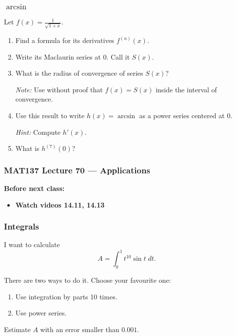 \documentclass[14pt]{beamer}
\newcommand{\p}{\pause}
\newcommand{\setsize}[1]{\fontsize{#1}{#1}\selectfont} %
\newcommand{\vv}{\vspace{.5cm}}
\newcommand{\vvv}{\vspace{.2cm}}
\begin{document}
	\begin{frame}[t]
		\frametitle{$\arcsin$}

		Let ${\displaystyle f(x)=\frac{1}{\sqrt{1+x}}}$.
		\begin{enumerate}
			\item Find a formula for its derivatives ${\displaystyle f^{(n)}(x)}$.
				\vvv

			\item Write its Maclaurin series at $0$. Call it $S(x)$. \vvv

			\item What is the radius of convergence of series $S(x)$?

				{\setsize{12} \emph{Note:} Use without proof that ${\displaystyle f(x)=S(x)}$ inside the interval of convergence. }
				\vvv

			\item Use this result to write $h(x) = \arcsin$ as a power series centered
				at $0$.

				{\setsize{12} \emph{Hint:} Compute ${\displaystyle h'(x)}$. } \vvv

			\item What is ${\displaystyle h^{(7)}(0)}$?
		\end{enumerate}
	\end{frame}






\begin{frame}
	\frametitle{MAT137 Lecture 70 --- Applications}

	\vfill
	{\bf Before next class:}
		\begin{itemize} \normalsize
			\item {\bf Watch videos 14.11, 14.13 }
		\end{itemize}
\end{frame}

	\begin{frame}[t]
		\frametitle{Integrals}

		I want to calculate
		\[
			A = \int_{0}^{1} t^{10}\sin t \; dt.
		\]

		There are two ways to do it. Choose your favourite one:
		\begin{enumerate}
			\item Use integration by parts 10 times.

			\item Use power series.
		\end{enumerate}
		\p \hrulefill \vv

		Estimate $A$ with an error smaller than $0.001$.
	\end{frame}
\end{document}
